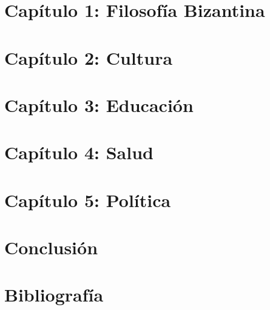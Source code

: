 \documentclass[a4paper,13pt,titlepage,oneside]{article}
\begin{document}
\section{Capítulo 1: Filosofía Bizantina}

\newpage

\section{Capítulo 2: Cultura}

\newpage

\section{Capítulo 3: Educación}

\newpage

\section{Capítulo 4: Salud}

\newpage

\section{Capítulo 5: Política}

\newpage

\section{Conclusión}

\newpage

\section{Bibliografía}

\newpage

\tableofcontents
\end{document}
